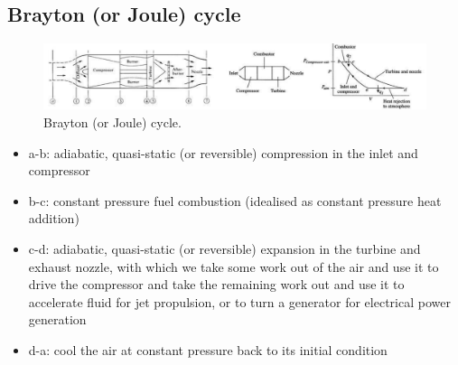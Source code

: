 \subsection{Brayton (or Joule) cycle}
\begin{figure}[H]
    \centering
    \includegraphics[width = \textwidth]{img/figure20.png}
    \caption{Brayton (or Joule) cycle.}
\end{figure}
\begin{itemize}
    \item a-b: adiabatic, quasi-static (or reversible) compression in the inlet and compressor
    \item b-c: constant pressure fuel combustion (idealised as constant pressure heat addition)
    \item c-d: adiabatic, quasi-static (or reversible) expansion in the turbine and exhaust nozzle, with which we take some work out of the air and use it to drive the compressor and take the remaining work out and use it to accelerate fluid for jet propulsion, or to turn a generator for electrical power generation
    \item d-a: cool the air at constant pressure back to its initial condition
\end{itemize}
